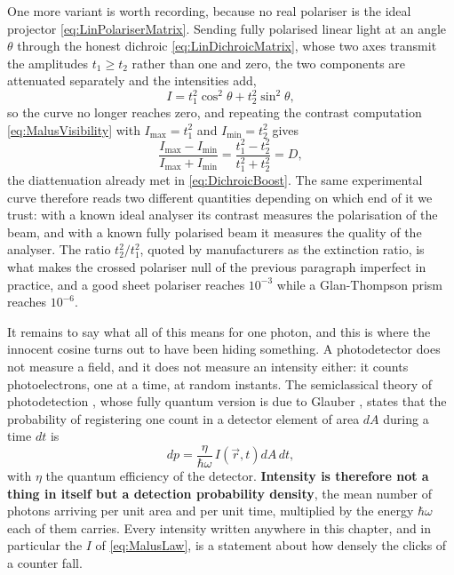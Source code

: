             One more variant is worth recording, because no real polariser is the ideal projector \ref{eq:LinPolariserMatrix}. Sending fully polarised linear light at an angle $\theta$ through the honest dichroic \ref{eq:LinDichroicMatrix}, whose two axes transmit the amplitudes $t_1\geq t_2$ rather than one and zero, the two components are attenuated separately and the intensities add,
            \begin{equation}\label{eq:MalusRealPolariser}
                I = t_1^2\cos^2\theta+t_2^2\sin^2\theta ,
            \end{equation}
            so the curve no longer reaches zero, and repeating the contrast computation \ref{eq:MalusVisibility} with $I_{\max}=t_1^2$ and $I_{\min}=t_2^2$ gives
            \begin{equation*}
                \frac{I_{\max}-I_{\min}}{I_{\max}+I_{\min}} = \frac{t_1^2-t_2^2}{t_1^2+t_2^2} = D,
            \end{equation*}
            the diattenuation already met in \ref{eq:DichroicBoost}. The same experimental curve therefore reads two different quantities depending on which end of it we trust: with a known ideal analyser its contrast measures the polarisation of the beam, and with a known fully polarised beam it measures the quality of the analyser. The ratio $t_2^2/t_1^2$, quoted by manufacturers as the extinction ratio, is what makes the crossed polariser null of the previous paragraph imperfect in practice, and a good sheet polariser reaches $10^{-3}$ while a Glan-Thompson prism reaches $10^{-6}$.

            It remains to say what all of this means for one photon, and this is where the innocent cosine turns out to have been hiding something. A photodetector does not measure a field, and it does not measure an intensity either: it counts photoelectrons, one at a time, at random instants. The semiclassical theory of photodetection \citep{mandel1995optical}, whose fully quantum version is due to Glauber \citep{glauber1963quantum}, states that the probability of registering one count in a detector element of area $dA$ during a time $dt$ is
            \begin{equation}\label{eq:PhotonRate}
                dp = \frac{\eta}{\hbar\omega}\,I\left(\vec{r},t\right)dA\,dt ,
            \end{equation}
            with $\eta$ the quantum efficiency of the detector. \textbf{Intensity is therefore not a thing in itself but a detection probability density}, the mean number of photons arriving per unit area and per unit time, multiplied by the energy $\hbar\omega$ each of them carries. Every intensity written anywhere in this chapter, and in particular the $I$ of \ref{eq:MalusLaw}, is a statement about how densely the clicks of a counter fall.

